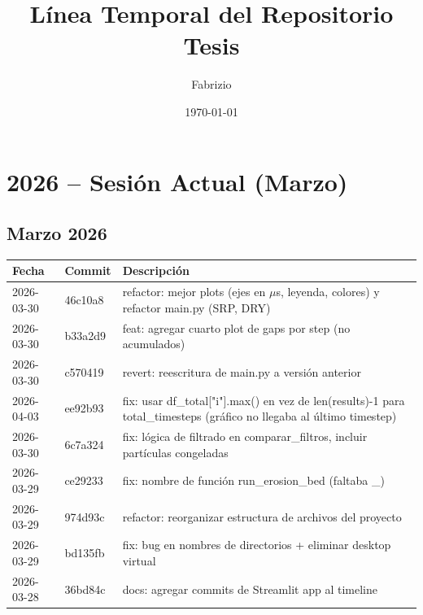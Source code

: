 \documentclass[12pt,a4paper]{article}
\title{Línea Temporal del Repositorio Tesis}
\author{Fabrizio}
\date{\today}
\begin{document}
\maketitle

\section*{2026 -- Sesión Actual (Marzo)}

\subsection*{Marzo 2026}

\begin{longtable}{@{}llp{10cm}@{}}
	\toprule
	\textbf{Fecha} & \textbf{Commit} & \textbf{Descripción}                                                                                                  \\
	\midrule
	2026-03-30     & 46c10a8         & refactor: mejor plots (ejes en $\mu$s, leyenda, colores) y refactor main.py (SRP, DRY)                                \\
	2026-03-30     & b33a2d9         & feat: agregar cuarto plot de gaps por step (no acumulados)                                                            \\
	2026-03-30     & c570419         & revert: reescritura de main.py a versión anterior                                                                     \\
	2026-04-03     & ee92b93         & fix: usar df\_total["i"].max() en vez de len(results)-1 para total\_timesteps (gráfico no llegaba al último timestep) \\
	2026-03-30     & 6c7a324         & fix: lógica de filtrado en comparar\_filtros, incluir partículas congeladas                                           \\
	2026-03-29     & ce29233         & fix: nombre de función run\_erosion\_bed (faltaba \_)                                                                 \\
	2026-03-29     & 974d93c         & refactor: reorganizar estructura de archivos del proyecto                                                             \\
	2026-03-29     & bd135fb         & fix: bug en nombres de directorios + eliminar desktop virtual                                                         \\
	2026-03-28     & 36bd84c         & docs: agregar commits de Streamlit app al timeline                                                                    \\

\end{longtable}
\end{document}
